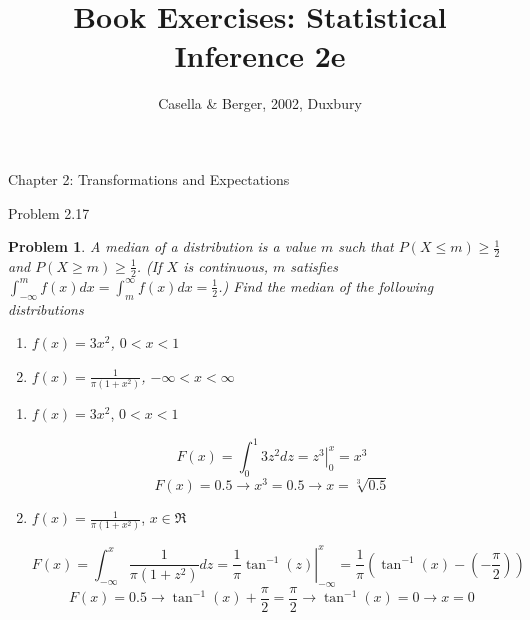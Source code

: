 \documentclass{article}
\title{Book Exercises: Statistical Inference 2e}
\author{Casella \& Berger, 2002, Duxbury}
\date{}
\newtheorem{problem}{Problem}
\newenvironment{penum}{
    \renewcommand{\theenumi}{\alph{enumi}}
    \renewcommand{\labelenumi}{(\theenumi)}
    \begin{enumerate}}{\end{enumerate}}
\begin{document}
\maketitle

\begin{section}{Chapter 2: Transformations and Expectations}

\begin{subsection}{Problem 2.17}
\begin{problem}
A \emph{median} of a distribution is a value $m$ such that 
$P(X \leq m) \geq \frac{1}{2}$ and $P(X \geq m) \geq \frac{1}{2}$.
(If $X$ is continuous, $m$ satisfies $\int_{-\infty}^m f(x) dx =
\int_{m}^{\infty} f(x) dx = \frac{1}{2}$.) Find the median of the 
following distributions

\begin{penum}
\item $f(x) = 3x^2$, $0 < x < 1$
\item $f(x) = \frac{1}{\pi (1 + x^2)}$, $-\infty < x < \infty$
\end{penum}
\end{problem}

\begin{enumerate}
\item $f(x) = 3x^2$, $0 < x < 1$

  \[ F(x) = \int_0^1 3z^2 dz = \left. z^3 \right|_0^x = x^3 \]
  \[ F(x) = 0.5 \rightarrow x^3 = 0.5 \rightarrow x = \sqrt[3]{0.5} \]

\item $f(x) = \frac{1}{\pi (1 + x^2)}$, $x \in \Re$

  \[ F(x) = \int_{-\infty}^x \frac{1}{\pi(1 + z^2)} dz = \left. \frac{1}{\pi} 
      \tan^{-1}(z) \right|_{-\infty}^x = 
      \frac{1}{\pi} (\tan^{-1}(x) - (-\frac{\pi}{2})) \]
  \[ F(x) = 0.5 \rightarrow \tan^{-1}(x) + \frac{\pi}{2} = \frac{\pi}{2} 
     \rightarrow \tan^{-1}(x) = 0 \rightarrow x = 0 \]

\end{enumerate}
\end{subsection}

\end{section}
\end{document}
